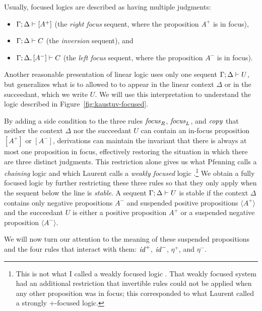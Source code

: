 Usually, focused logics are described as
having multiple judgments:
\begin{itemize}
\item ${\Gamma};{\Delta} \vdash [{A^+}] \mathstrut$ (the {\it right focus} sequent, where
the proposition $A^+$ is in focus),
\item ${\Gamma};{\Delta} \vdash {C} \mathstrut$ (the {\it inversion} sequent), and
\item ${\Gamma};{\Delta}, [{A^-}] \vdash {C} \mathstrut$ (the {\it left focus} sequent,
where the proposition $A^-$ is in focus).
\end{itemize}
Another reasonable presentation of linear logic uses only one sequent
${\Gamma};{\Delta} \vdash {U} \mathstrut$, but generalizes what is to allowed to
to appear in the linear context $\Delta$ or in the succeedant, which
we write $U$. We will use this interpretation to understand the logic
described in Figure~\ref{fig:kaustuv-focused}.



By adding a side condition to the three rules ${\it focus}_R$, ${\it
  focus}_L$, and ${\it copy}$ that neither the context $\Delta$ nor
the succeedant $U$ can contain an in-focus proposition $[A^+]$ or
$[A^-]$, derivations can maintain the invariant that there is always
at most one proposition in focus, effectively restoring the situation
in which there are three distinct judgments.  This restriction alone
gives us what Pfenning calls a {\it chaining} logic
\cite{pfenning02chaining} and which Laurent calls a {\it weakly
  focused} logic \cite{laurent04proof}.\footnote{This is not what I
  called a weakly focused logic \cite{simmons09weak}. That weakly
  focused system had an additional restriction that invertible rules
  could not be applied when any other proposition was in focus; this
  corresponded to what Laurent called a strongly $+$-focused logic.}
We obtain a fully focused logic by further restricting these three
rules so that they only apply when the sequent below the line is {\it
  stable}.  A sequent ${\Gamma};{\Delta} \vdash {U} \mathstrut$ is stable if the
context $\Delta$ contains only negative propositions $A^-$ and
suspended positive propositions $\langle A^+ \rangle$ and the
succeedant $U$ is either a positive proposition $A^+$ or a suspended
negative proposition $\langle A^- \rangle$. 

We will now turn our attention to the meaning of these suspended
propositions and the four rules that interact with them: ${\it id}^+$,
${\it id}^-$, $\eta^+$, and $\eta^-$.

